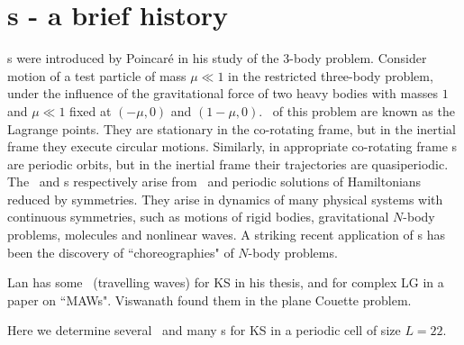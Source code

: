 %


\section{{\Rpo s} - a brief history}

{\Rpo s} were introduced by Poincar\'e in his study of 
the 3-body problem.
Consider motion of a test particle of mass
$\mu \ll 1$ in the
restricted three-body problem,
under the
influence of the gravitational force of two heavy bodies with masses $1$ and
$\mu \ll 1$ fixed at $(-\mu,0)$ and $(1-\mu,0)$. \Reqva\ of this problem
are known as the Lagrange points. They are stationary in
the co-rotating frame, but
in the inertial frame they execute circular motions.
Similarly, in appropriate co-rotating frame
{\rpo s} are periodic orbits, 
but in the inertial frame their trajectories
are quasiperiodic. 
The \reqva\ and \rpo s 
respectively arise from
\eqva\ and periodic solutions of Hamiltonians reduced by symmetries.
They arise in dynamics of many physical systems
with continuous symmetries, such as motions of rigid bodies, gravitational
$N$-body problems, molecules and nonlinear waves.
A striking recent application of \rpo s has been the discovery
of ``choreographies" of $N$-body problems.

Lan has some \reqva\ (travelling waves) for KS in his
thesis, %
 and for complex LG in a paper on ``MAWs".
Viswanath %
found them in the plane Couette problem.

Here we determine 
several \eqva\ and many \rpo s for 
KS in a periodic cell of size $L=22$.

